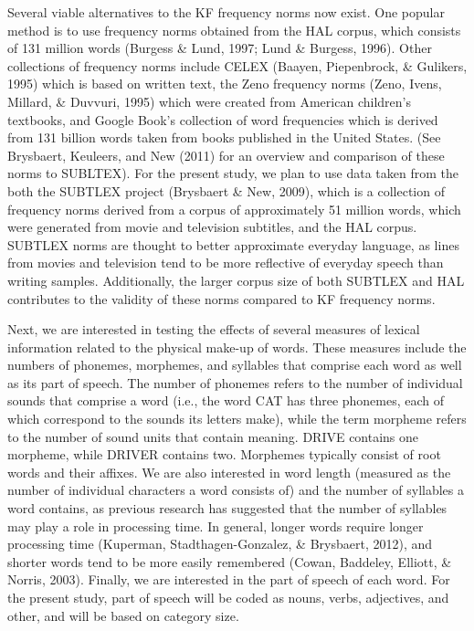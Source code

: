 \documentclass[english,man]{apa6}
\theoremstyle{definition}
\theoremstyle{definition}
\theoremstyle{remark}
\begin{document}
Several viable alternatives to the KF frequency norms now exist. One
popular method is to use frequency norms obtained from the HAL corpus,
which consists of 131 million words (Burgess \& Lund, 1997; Lund \&
Burgess, 1996). Other collections of frequency norms include CELEX
(Baayen, Piepenbrock, \& Gulikers, 1995) which is based on written text,
the Zeno frequency norms (Zeno, Ivens, Millard, \& Duvvuri, 1995) which
were created from American children's textbooks, and Google Book's
collection of word frequencies which is derived from 131 billion words
taken from books published in the United States. (See Brysbaert,
Keuleers, and New (2011) for an overview and comparison of these norms
to SUBLTEX). For the present study, we plan to use data taken from the
both the SUBTLEX project (Brysbaert \& New, 2009), which is a collection
of frequency norms derived from a corpus of approximately 51 million
words, which were generated from movie and television subtitles, and the
HAL corpus. SUBTLEX norms are thought to better approximate everyday
language, as lines from movies and television tend to be more reflective
of everyday speech than writing samples. Additionally, the larger corpus
size of both SUBTLEX and HAL contributes to the validity of these norms
compared to KF frequency norms.

Next, we are interested in testing the effects of several measures of
lexical information related to the physical make-up of words. These
measures include the numbers of phonemes, morphemes, and syllables that
comprise each word as well as its part of speech. The number of phonemes
refers to the number of individual sounds that comprise a word (i.e.,
the word CAT has three phonemes, each of which correspond to the sounds
its letters make), while the term morpheme refers to the number of sound
units that contain meaning. DRIVE contains one morpheme, while DRIVER
contains two. Morphemes typically consist of root words and their
affixes. We are also interested in word length (measured as the number
of individual characters a word consists of) and the number of syllables
a word contains, as previous research has suggested that the number of
syllables may play a role in processing time. In general, longer words
require longer processing time (Kuperman, Stadthagen-Gonzalez, \&
Brysbaert, 2012), and shorter words tend to be more easily remembered
(Cowan, Baddeley, Elliott, \& Norris, 2003). Finally, we are interested
in the part of speech of each word. For the present study, part of
speech will be coded as nouns, verbs, adjectives, and other, and will be
based on category size.
\end{document}
